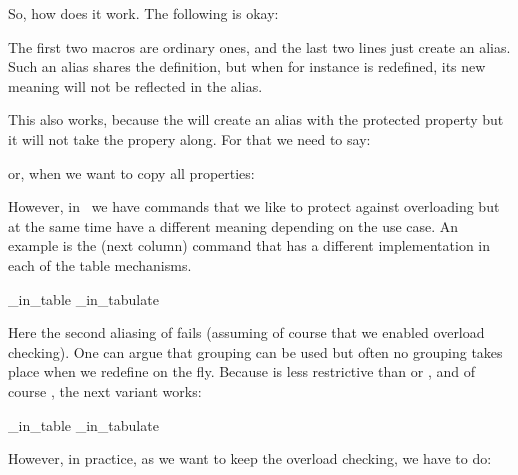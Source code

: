 So, how does it work. The following is okay:

\starttyping[option=TEX]
\def\MacroB{B}
\let\MyMacro\MacroA
\let\MyMacro\MacroB
\stoptyping

The first two macros are ordinary ones, and the last two lines just create an alias. Such
an alias shares the definition, but when for instance \type {\MacroA} is redefined, its
new meaning will not be reflected in the alias.

\starttyping[option=TEX]
\permanent\protected{}
\permanent\protected\def\MacroB{B}
\let\MyMacro\MacroA
\let\MyMacro\MacroB
\stoptyping

This also works, because the \type {\let} will create an alias with the protected
property but it will not take the  propery along. For that we need
to say:

\starttyping[option=TEX]
\permanent\protected{}
\permanent\protected\def\MacroB{B}
\permanent\let\MyMacro\MacroA
\permanent\let\MyMacro\MacroB
\stoptyping

or, when we want to copy all properties:

\starttyping[option=TEX]
\permanent\protected{}
\permanent\protected\def\MacroB{B}
\aliased\let\MyMacro\MacroA
\aliased\let\MyMacro\MacroB
\stoptyping

However, in \CONTEXT\ we have commands that we like to protect against
overloading but at the same time have a different meaning depending on the use
case. An example is the \type {\NC} (next column) command that has a different
implementation in each of the table mechanisms.

\starttyping[option=TEX]
\permanent\protected{}
\permanent\protected{}
\aliased\let\NC\NC_in_table
\aliased\let\NC\NC_in_tabulate
\stoptyping

Here the second aliasing of \type {\NC} fails (assuming of course that we enabled
overload checking). One can argue that grouping can be used but often no grouping
takes place when we redefine on the fly. Because  is less restrictive
than  or , and of course , the
next variant works:

\starttyping[option=TEX]
\frozen\protected{}
\frozen\protected{}
\overloaded\let\NC\NC_in_table
\overloaded\let\NC\NC_in_tabulate
\stoptyping

However, in practice, as we want to keep the overload checking, we have to do:

